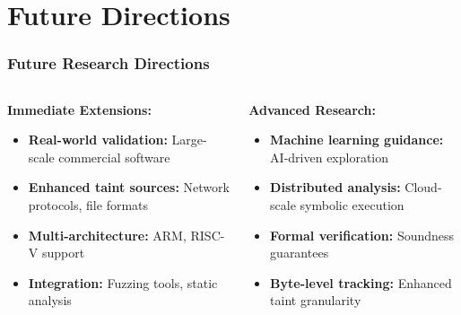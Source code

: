 \documentclass[aspectratio=169]{beamer}
\begin{document}
\section{Future Directions}

\begin{frame}
    \frametitle{Future Research Directions}
    \begin{columns}
        \begin{column}{0.5\textwidth}
            \textbf{Immediate Extensions:}
            \begin{itemize}
                \item \textbf{Real-world validation:} Large-scale commercial software
                \item \textbf{Enhanced taint sources:} Network protocols, file formats
                \item \textbf{Multi-architecture:} ARM, RISC-V support
                \item \textbf{Integration:} Fuzzing tools, static analysis
            \end{itemize}
        \end{column}
        \begin{column}{0.5\textwidth}
            \textbf{Advanced Research:}
            \begin{itemize}
                \item \textbf{Machine learning guidance:} AI-driven exploration
                \item \textbf{Distributed analysis:} Cloud-scale symbolic execution
                \item \textbf{Formal verification:} Soundness guarantees
                \item \textbf{Byte-level tracking:} Enhanced taint granularity
            \end{itemize}
        \end{column}
    \end{columns}
\end{frame}
\end{document}
